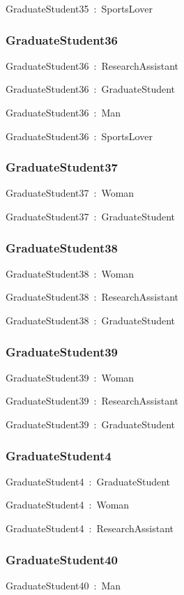\documentclass{article}
\begin{document}
GraduateStudent35~:~SportsLover

\subsubsection*{GraduateStudent36}

GraduateStudent36~:~ResearchAssistant

GraduateStudent36~:~GraduateStudent

GraduateStudent36~:~Man

GraduateStudent36~:~SportsLover

\subsubsection*{GraduateStudent37}

GraduateStudent37~:~Woman

GraduateStudent37~:~GraduateStudent

\subsubsection*{GraduateStudent38}

GraduateStudent38~:~Woman

GraduateStudent38~:~ResearchAssistant

GraduateStudent38~:~GraduateStudent

\subsubsection*{GraduateStudent39}

GraduateStudent39~:~Woman

GraduateStudent39~:~ResearchAssistant

GraduateStudent39~:~GraduateStudent

\subsubsection*{GraduateStudent4}

GraduateStudent4~:~GraduateStudent

GraduateStudent4~:~Woman

GraduateStudent4~:~ResearchAssistant

\subsubsection*{GraduateStudent40}

GraduateStudent40~:~Man
\end{document}
